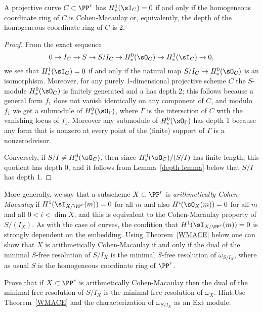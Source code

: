 \begin{proposition}\label{meaning of ACM}
A projective curve $C \subset \PP^r$  has $H^1_*(\sI_C) = 0$ if and only if the homogeneous coordinate ring of $C$
is Cohen-Macaulay or, equivalently, the depth of the homogeneous  coordinate ring of $C$ is 2.
\end{proposition}

\begin{proof}
 From the exact sequence
$$
0\to I_C \to S \to S/I_C \to  H^0_*( \sO_C) \to H^1_*(\sI_C) \to 0,
$$
we see that $H^1_*(\sI_C) = 0$ if and only if the natural map $S/I_C\to H^0_*(\sO_C)$ is an isomorphism. 
Moreover, for any purely 1-dimensional projective scheme $C$ the $S$-module $H^0_*(\sO_C)$ is finitely generated and
a has depth 2; this follows because
a general form $f_1$ does not vanish identically on any component of $C$, and modulo $f_1$ we get a submodule of $H^0_*(\sO_\Gamma)$, where $\Gamma$ is the intersction of $C$ with the vanishing locus of $f_1$. Moreover any submodule of $H^0_*(\sO_\Gamma)$ has depth
1 because any form that is nonzero at every point of the (finite) support of $\Gamma$ is a nonzerodivisor.

Conversely, if $S/I\neq H^0_*( \sO_C)$, then since $H^0_*( \sO_C)/(S/I)$ has finite length, this quotient has depth 0,
and it follows from Lemma~\ref{depth lemma} below that $S/I$ has depth 1.
\end{proof}

More generally, we say that a subscheme $X\subset \PP^r$ is \emph{arithmetically Cohen-Macaulay}
if $H^1(\sI_{X/\PP^r}(m)) = 0$ for all $m$ and also $H^i(\sO_X(m)) = 0$ for all $m$ and all $0<i<\dim X$,
and this is equivalent to the Cohen-Macaulay property of $S/(I_X)$. As with the case of curves,
the condition that $H^1(\sI_{X/\PP^r}(m)) = 0$ 
is strongly dependent on the embedding. Using Theorem~\ref{WMACE} below one can show
that $X$ is arithmetically Cohen-Macaulay if and only if the dual of the minimal $S$-free resolution
of $S/I_X$ is the minimal $S$-free resolution of $\omega_{S/I_X}$, where as usual $S$ is the
homogeneous coordinate ring of $\PP^r$.

\begin{exercise}
Prove that if $X\subset \PP^r$ is arithmetically Cohen-Macaulay then the dual of the minimal free resolution of $S/I_X$
is the minimal free resolution of $\omega_X$. Hint:Use Theorem~\ref{WMACE} and the characterization of $\omega_{S/I_X}$
as an Ext module.
\end{exercise}

